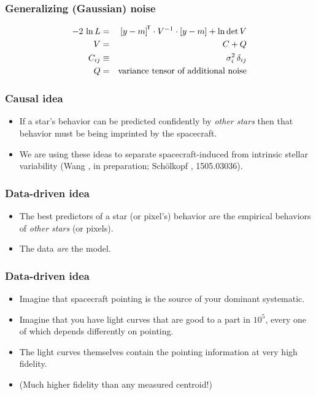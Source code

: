 \documentclass[pdftex]{beamer}
\begin{document}
\begin{frame}
  \frametitle{Generalizing (Gaussian) noise}
  \begin{eqnarray}
    -2\,\ln L &=& {[y - m]}^{\mathsf{\!T}}\cdot V^{-1}\cdot [y - m] + \ln\det V
    \nonumber \\
    V &=& C + Q
    \nonumber \\
    C_{ij} &\equiv& \sigma_i^2\,\delta_{ij}
    \nonumber \\
    Q &=& \mbox{variance tensor of additional noise}
    \nonumber
  \end{eqnarray}
\end{frame}

\begin{frame}
  \frametitle{Causal idea}
  \begin{itemize}
  \item If a star's behavior can be predicted confidently by
    \emph{other stars} then that behavior must be being imprinted by
    the spacecraft.
  \item We are using these ideas to separate spacecraft-induced from
    intrinsic stellar variability (Wang \etal, in preparation;
    Sch\"olkopf \etal, 1505.03036).
  \end{itemize}
\end{frame}

\begin{frame}
  \frametitle{Data-driven idea}
  \begin{itemize}
  \item The best predictors of a star (or pixel's) behavior are the
    empirical behaviors of \emph{other stars} (or pixels).
  \item The data \emph{are} the model.
  \end{itemize}
\end{frame}

\begin{frame}
  \frametitle{Data-driven idea}
  \begin{itemize}
  \item Imagine that spacecraft pointing is the source of your
    dominant systematic.
  \item Imagine that you have light curves that are good to a part in
    $10^5$, every one of which depends differently on pointing.
  \item The light curves themselves contain the pointing information
    at very high fidelity.
  \item (Much higher fidelity than any measured centroid!)
  \end{itemize}
\end{frame}
\end{document}
